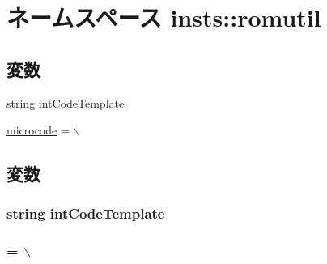 \hypertarget{namespaceinsts_1_1romutil}{
\section{ネームスペース insts::romutil}
\label{namespaceinsts_1_1romutil}
}
\subsection*{変数}
\begin{DoxyCompactItemize}
\item 
string \hyperlink{namespaceinsts_1_1romutil_a3bfff3a1acbca58c4dd4b2e5af179d97}{intCodeTemplate}
\item 
\hyperlink{namespaceinsts_1_1romutil_a8368f1912d665423a371bac86ae42a22}{microcode} = $\backslash$
\end{DoxyCompactItemize}


\subsection{変数}
\hypertarget{namespaceinsts_1_1romutil_a3bfff3a1acbca58c4dd4b2e5af179d97}{
\subsubsection[{intCodeTemplate}]{\setlength{\rightskip}{0pt plus 5cm}string {\bf intCodeTemplate}}}
\label{namespaceinsts_1_1romutil_a3bfff3a1acbca58c4dd4b2e5af179d97}
\hypertarget{namespaceinsts_1_1romutil_a8368f1912d665423a371bac86ae42a22}{
\subsubsection[{microcode}]{ = $\backslash$}}
\label{namespaceinsts_1_1romutil_a8368f1912d665423a371bac86ae42a22}
